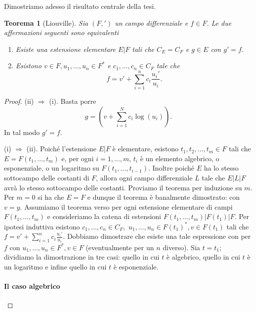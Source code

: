 \documentclass[10pt,oneside]{article}
\theoremstyle{definition}
\theoremstyle{plain}
\newtheorem{teo}{Teorema}
\theoremstyle{definition}
\theoremstyle{plain}
\theoremstyle{plain}
\begin{document}
Dimostriamo adesso il risultato centrale della tesi.
\begin{teo}[Liouville]\label{teo:liouv} Sia $(F,')$ un campo differenziale e $f \in F$. Le due affermazioni seguenti sono equivalenti
\begin{enumerate}
\item[(i)]Esiste una estensione elementare $E|F$ tali che $C_E=C_F$ e $g \in E$ con $g'=f$. \item[(ii)]Esistono $v \in F, u_1, \dots, u_n \in F^*$ e $c_1,\dots, c_n \in C_F$ tale che 
\[ f = v'+\sum_{i=1}^n c_i \frac{u_i'}{u_i}. \]
\end{enumerate}
\end{teo}
\begin{proof}
(ii) $\Rightarrow$ (i). Basta porre
\[g= \left(v+\sum_{i=1}^N c_i\log(u_i)  \right). \]
In tal modo $g'=f$.

(i) $\Rightarrow$ (ii).  Poiché l'estensione $E|F$ è elementare, esistono $t_1,t_2,\dots,t_m \in F$ tali che $E=F(t_1, \dots,t_m)$ e,  per ogni $i=1,\dots,m $, $t_i$ è un elemento algebrico, o esponenziale, o un logaritmo su $F(t_1,\dots,t_{i-1})$. Inoltre poiché $E$ ha lo stesso sottocampo delle costanti di $F$, allora ogni campo differenziale $L$ tale che $E|L|F$ avrà lo stesso sottocampo delle costanti. Proviamo il teorema per induzione su $m$. Per $m=0$ si ha che $E=F$ e dunque il teorema è banalmente dimostrato: con $v=y$. Assumiamo il teorema verso per ogni estensione elementare di campi $F(t_1,\dots,t_m)$ e consideriamo la catena di estensioni $F(t_1,\dots,t_m)|F(t_1)|F$. Per ipotesi induttiva esistono $c_1,\dots,c_n \in C_F,$ $u_1,\dots,u_n \in F(t_1)^*, v \in F(t_1)$ tali che $f= v'+\sum_{i=1}^n c_i \frac{u_i'}{u_i} $. Dobbiamo dimostrare che esiste una tale espressione con per $f$ con $u_1,\dots,u_n \in F^*, v \in F$ (eventualmente per un $n$ diverso). Sia $t=t_1$; dividiamo la dimostrazione in tre casi: quello in cui $t$ è algebrico, quello in cui $t$ è un logaritmo e infine quello in cui $t$ è esponenziale. 

\paragraph{Il caso algebrico}


\end{proof}
\end{document}
